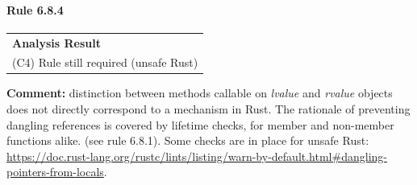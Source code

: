 \paragraph{Rule 6.8.4}
\begin{longtable}{p{13cm}}
\textbf{Analysis Result} \\
(C4) Rule still required (unsafe Rust) \\
\end{longtable}
\textbf{Comment:} \Cpp distinction between methods callable on \textit{lvalue} and \textit{rvalue} objects does not directly correspond to a mechanism in Rust. The rationale of preventing dangling references is covered by lifetime checks, for member and non-member functions alike. (see rule 6.8.1). Some checks are in place for unsafe Rust: \url{https://doc.rust-lang.org/rustc/lints/listing/warn-by-default.html#dangling-pointers-from-locals}. \\
